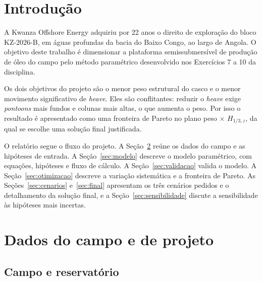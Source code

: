 \documentclass[11pt,a4paper]{article}
\newcommand{\Hz}{H_{1/3,z}}
\begin{document}
\tableofcontents
\newpage

\section{Introdução}

A Kwanza Offshore Energy adquiriu por 22 anos o direito de exploração do bloco KZ-2026-B, em
águas profundas da bacia do Baixo Congo, ao largo de Angola. O objetivo deste trabalho é
dimensionar a plataforma semissubmersível de produção de óleo do campo pelo método paramétrico
desenvolvido nos Exercícios 7 a 10 da disciplina.

Os dois objetivos do projeto são o menor peso estrutural do casco e o menor movimento
significativo de \emph{heave}. Eles são conflitantes: reduzir o \emph{heave} exige
\emph{pontoons} mais fundos e colunas mais altas, o que aumenta o peso. Por isso o resultado é
apresentado como uma fronteira de Pareto no plano peso $\times$ $\Hz$, da qual se escolhe uma
solução final justificada.

O relatório segue o fluxo do projeto. A Seção~\ref{sec:dados} reúne os dados do campo e as
hipóteses de entrada. A Seção~\ref{sec:modelo} descreve o modelo paramétrico, com equações,
hipóteses e fluxo de cálculo. A Seção~\ref{sec:validacao} valida o modelo. A
Seção~\ref{sec:otimizacao} descreve a variação sistemática e a fronteira de Pareto. As
Seções~\ref{sec:cenarios} e~\ref{sec:final} apresentam os três cenários pedidos e o
detalhamento da solução final, e a Seção~\ref{sec:sensibilidade} discute a sensibilidade às
hipóteses mais incertas.

\section{Dados do campo e de projeto}\label{sec:dados}

\subsection{Campo e reservatório}
\end{document}
